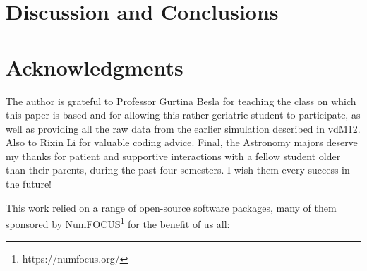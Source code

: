\documentclass[twocolumn]{aastex63}
\newcommand{\todo}{\color{red}{TODO}\color{black}\hspace{2mm}}
\begin{document}
\todo{\textbf{$V_{esc}(r)$}}




\section{Discussion and Conclusions}

\todo{\textbf{\textit{add some!}}}



\section{Acknowledgments}

The author is grateful to Professor Gurtina Besla for teaching the class on which this paper is based and for allowing this rather geriatric student to participate, as well as providing all the raw data from the earlier simulation described in vdM12. Also to Rixin Li for valuable coding advice. Final, the Astronomy majors deserve my thanks for patient and supportive interactions with a fellow student older than their parents, during the past four semesters. I wish them every success in the future!

This work relied on a range of open-source software packages, many of them sponsored by NumFOCUS\footnote{https://numfocus.org/} for the benefit of us all: 
\end{document}
